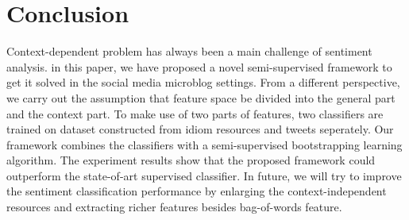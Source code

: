 \documentclass{llncs}
\begin{document}
\section{Conclusion}
\label{conclusion}
Context-dependent problem has always been a main challenge of sentiment analysis.
in this paper, we have proposed a novel semi-supervised framework to get it solved in the social media microblog settings. 
From a different perspective, we carry out the assumption that feature space be divided into the general part and the context part.
To make use of two parts of features, two classifiers are trained on dataset constructed from idiom resources and tweets seperately. 
Our framework combines the classifiers with a semi-supervised bootstrapping learning algorithm. 
The experiment results show that the proposed framework could outperform the state-of-art supervised classifier. 
In future, we will try to improve the sentiment classification performance by enlarging the context-independent resources and extracting richer features besides bag-of-words feature.



\end{document}
